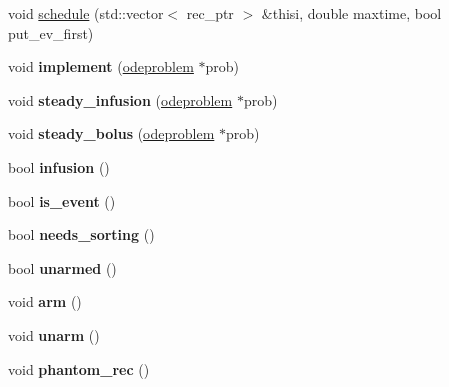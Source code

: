 \begin{DoxyCompactItemize}
void \hyperlink{classdatarecord_aaf2f67fbf31989c3fa6896126ac24ef9}{schedule} (std\+::vector$<$ rec\+\_\+ptr $>$ \&thisi, double maxtime, bool put\+\_\+ev\+\_\+first)
\item 
\mbox{\label{classdatarecord_accb0e06574f1b758342e967049dc47ae}} 
void {\bfseries implement} (\hyperlink{classodeproblem}{odeproblem} $\ast$prob)
\item 
\mbox{\label{classdatarecord_a2e7bd0f299e76d1fd5608a85a73cdbf0}} 
void {\bfseries steady\+\_\+infusion} (\hyperlink{classodeproblem}{odeproblem} $\ast$prob)
\item 
\mbox{\label{classdatarecord_a23944c129303495c6978767f4a03f124}} 
void {\bfseries steady\+\_\+bolus} (\hyperlink{classodeproblem}{odeproblem} $\ast$prob)
\item 
\mbox{\label{classdatarecord_aedab07e4ab4564579f7eb7511d8ac46e}} 
bool {\bfseries infusion} ()
\item 
\mbox{\label{classdatarecord_abe9fb68bb832c1f480721076c0e3954e}} 
bool {\bfseries is\+\_\+event} ()
\item 
\mbox{\label{classdatarecord_ab17d439804932ebd46bf091a2762e98c}} 
bool {\bfseries needs\+\_\+sorting} ()
\item 
\mbox{\label{classdatarecord_aa84909506d920ea312809730440720d4}} 
bool {\bfseries unarmed} ()
\item 
\mbox{\label{classdatarecord_a2613ccc7bfb8da426c11fde6a75139c2}} 
void {\bfseries arm} ()
\item 
\mbox{\label{classdatarecord_adba905e12d11b53c0a75eff66e56cd24}} 
void {\bfseries unarm} ()
\item 
\mbox{\label{classdatarecord_ae7e13b74c70e5c4e634dd18127a69da8}} 
void {\bfseries phantom\+\_\+rec} ()
\end{DoxyCompactItemize}
